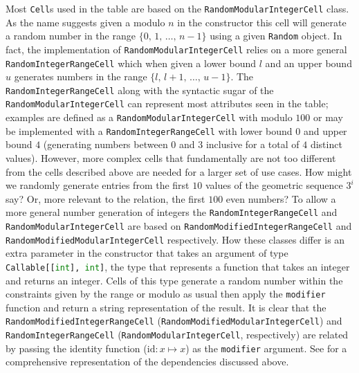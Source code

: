 Most \lstinline{Cell}s used in the  table are based on the
\lstinline{RandomModularIntegerCell} class. As the name suggests given a modulo
$n$ in the constructor this cell will generate a random number in the range $\{0,
\,1,\,\ldots,\,n - 1\}$ using a given \lstinline{Random} object. In fact, the
implementation of \lstinline{RandomModularIntegerCell} relies on a more general
\lstinline{RandomIntegerRangeCell} which when given a lower bound $l$ and an
upper bound $u$ generates numbers in the range $\{l,\,l + 1,\,\ldots,\,u - 1\}$.
The \lstinline{RandomIntegerRangeCell} along with the syntactic sugar of the
\lstinline{RandomModularIntegerCell} can represent most attributes seen in the
 table; examples are  defined as a
\lstinline{RandomModularIntegerCell} with modulo $100$ or
 may be implemented with a
\lstinline{RandomIntegerRangeCell} with lower bound $0$ and upper bound $4$
(generating numbers between $0$ and $3$ inclusive for a total of $4$ distinct
values). However, more complex cells that fundamentally are not too different
from the cells described above are needed for a larger set of use cases. How
might we randomly generate entries from the first $10$ values of the geometric
sequence $3^i$ say? Or, more relevant to the  relation, the
first $100$ even numbers? To allow a more general number generation of
integers the \lstinline{RandomIntegerRangeCell} and
\lstinline{RandomModularIntegerCell} are based on
\lstinline{RandomModifiedIntegerRangeCell} and
\lstinline{RandomModifiedModularIntegerCell} respectively. How these classes
differ is an extra parameter in the constructor that takes an argument of type
\lstinline[language=Python]{Callable[[int], int]}, the type that represents a function that takes an integer
and returns an integer. Cells of this type generate a random number within the
constraints given by the range or modulo as usual then apply the
\lstinline{modifier} function and return a string representation of the result.
It is clear that the \lstinline{RandomModifiedIntegerRangeCell}
(\lstinline{RandomModifiedModularIntegerCell}) and
\lstinline{RandomIntegerRangeCell} (\lstinline{RandomModularIntegerCell},
respectively)
are related by passing the identity function ($\mathrm{id}: x \mapsto x$) as the
\lstinline{modifier} argument. See
 for a
comprehensive representation of the dependencies discussed above.

